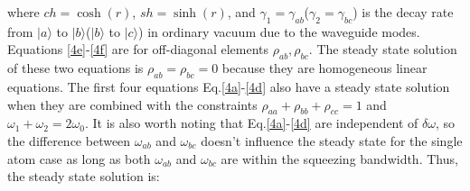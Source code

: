 \documentclass[aps,showpacs,twocolumn,twoside,groupedaddress]{revtex4}
\begin{document}
where $ch=\cosh(r)$, $sh=\sinh(r)$, and $\gamma_{1}=\gamma_{ab}$($\gamma_{2}=\gamma_{bc}$) is the decay rate from $|a\rangle$ to $|b\rangle$($|b\rangle$ to $|c\rangle$) in ordinary vacuum due to the waveguide modes. Equations \eqref{4e}-\eqref{4f} are for off-diagonal elements $\rho_{ab}, \rho_{bc}$. The steady state solution of these two equations is $\rho_{ab}=\rho_{bc}=0$ because they are homogeneous linear equations. The first four equations Eq.\eqref{4a}-\eqref{4d} also have a steady state solution when they are combined with the constraints $\rho_{aa}+\rho_{bb}+\rho_{cc}=1$ and $\omega_1+\omega_2=2\omega_0$. It is also worth noting that Eq.\eqref{4a}-\eqref{4d} are independent of $\delta\omega$, so the difference between $\omega_{ab}$ and $\omega_{bc}$ doesn't influence the steady state for the single atom case as long as both $\omega_{ab}$ and $\omega_{bc}$ are within the squeezing bandwidth. Thus, the steady state solution is:
\end{document}
